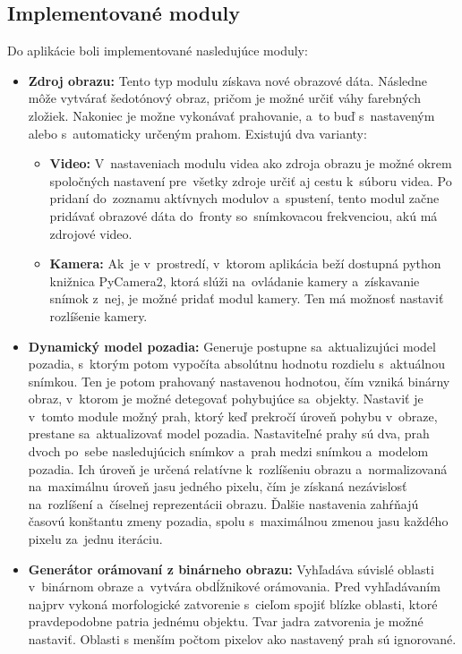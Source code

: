         \subsection{Implementované moduly}
            Do aplikácie boli implementované nasledujúce moduly:
            \begin{itemize}
                \item \textbf{Zdroj obrazu:} Tento typ modulu získava nové obrazové dáta. Následne môže vytvárať šedotónový obraz, pričom je možné určiť váhy farebných zložiek. Nakoniec je možne vykonávať prahovanie, a~to buď s~nastaveným alebo s~automaticky určeným prahom. Existujú dva varianty: 
                \begin{itemize}
                    \item \textbf{Video:} V~nastaveniach modulu videa ako zdroja obrazu je možné okrem spoločných nastavení pre~všetky zdroje určiť aj cestu k~súboru videa. Po pridaní do~zoznamu aktívnych modulov a~spustení, tento modul začne pridávať obrazové dáta do~fronty so~snímkovacou frekvenciou, akú má zdrojové video.
                    \item \textbf{Kamera:} Ak~je v~prostredí, v~ktorom aplikácia beží dostupná python knižnica PyCamera2, ktorá slúži na~ovládanie kamery a~získavanie snímok z~nej, je možné pridať modul kamery. Ten má možnosť nastaviť rozlíšenie kamery.
                \end{itemize}
                \item \textbf{Dynamický model pozadia:} Generuje postupne sa~aktualizujúci model pozadia, s~ktorým potom vypočíta absolútnu hodnotu rozdielu s~aktuálnou snímkou. Ten je potom prahovaný nastavenou hodnotou, čím vzniká binárny obraz, v~ktorom je možné detegovať pohybujúce sa~objekty. Nastaviť je v~tomto module možný prah, ktorý keď prekročí úroveň pohybu v~obraze, prestane sa~aktualizovať model pozadia. Nastaviteľné prahy sú dva, prah dvoch po~sebe nasledujúcich snímkov a~prah medzi snímkou a~modelom pozadia. Ich úroveň je určená relatívne k~rozlíšeniu obrazu a~normalizovaná na~maximálnu úroveň jasu jedného pixelu, čím je získaná nezávislosť na~rozlíšení a~číselnej reprezentácii obrazu. Ďalšie nastavenia zahŕňajú časovú konštantu zmeny pozadia, spolu s~maximálnou zmenou jasu každého pixelu za~jednu iteráciu. 
                \item \textbf{Generátor orámovaní z binárneho obrazu:} Vyhľadáva súvislé oblasti v~binárnom obraze a~vytvára obdĺžnikové orámovania. Pred vyhľadávaním najprv vykoná morfologické zatvorenie s~cieľom spojiť blízke oblasti, ktoré pravdepodobne patria jednému objektu. Tvar jadra zatvorenia je možné nastaviť. Oblasti s menším počtom pixelov ako nastavený prah sú ignorované.

\end{itemize}
